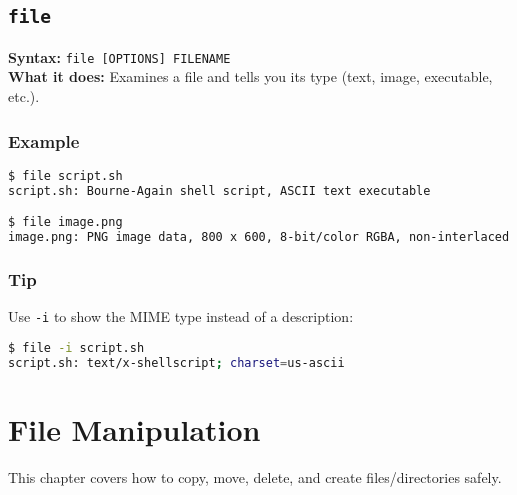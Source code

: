 \documentclass[10pt,oneside]{scrbook}
\begin{document}
\section{\texttt{file}}
\begin{cmdbox}
  \textbf{Syntax:} \lstinline!file [OPTIONS] FILENAME! \\
  \textbf{What it does:} Examines a file and tells you its type (text, image, executable, etc.).
\end{cmdbox}
\begin{commanddetails}
  \subsection*{Example}
  \begin{lstlisting}[language=bash]
$ file script.sh
script.sh: Bourne-Again shell script, ASCII text executable

$ file image.png
image.png: PNG image data, 800 x 600, 8-bit/color RGBA, non-interlaced
  \end{lstlisting}

  \subsection*{Tip}
  Use \lstinline!-i! to show the MIME type instead of a description:
  \begin{lstlisting}[language=bash]
$ file -i script.sh
script.sh: text/x-shellscript; charset=us-ascii
  \end{lstlisting}
\end{commanddetails}

\chapter{File Manipulation}

This chapter covers how to copy, move, delete, and create files/directories safely.

\end{document}
